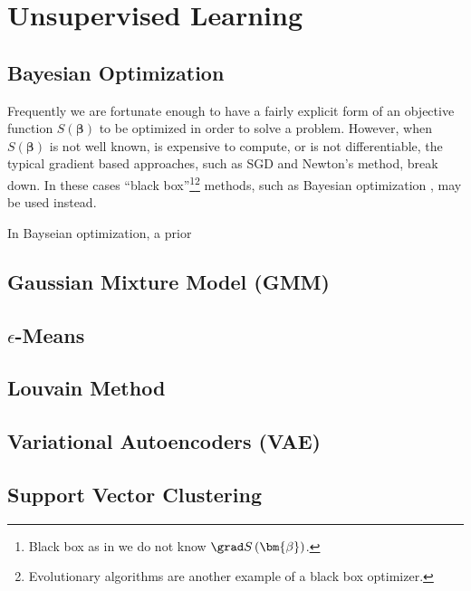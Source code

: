 \section{Unsupervised Learning}
\label{additional:unsupervised}

\subsection{Bayesian Optimization}
\label{additional:unsupervised:BO}

Frequently we are fortunate enough to have a fairly explicit form of
an objective function $S\left(\bm{\beta}\right)$ to be optimized in order to solve a problem.
However, when $S\left(\bm{\beta}\right)$ is not well known, is expensive to compute, or is not differentiable,
the typical gradient based approaches, such as SGD and Newton's method, break down.
In these cases ``black box''\footnote{Black box as in we do not know $\grad S\left(\bm{\beta}\right)$.}\footnote{Evolutionary algorithms
are another example of a black box optimizer.} methods,
such as Bayesian optimization \cite{Brochu2010,1301.1942,Borisyak,Hutter2014}, may be used instead.

In Bayseian optimization, a prior 


\subsection{Gaussian Mixture Model (GMM)}
\label{additional:unsupervised:GMM}

\subsection{\texorpdfstring{$\epsilon$}{epsilon}-Means}
\label{additional:unsupervised:epsilonMean}

\subsection{Louvain Method}
\label{additional:unsupervised:louvain}

\subsection{Variational Autoencoders (VAE)}
\label{additional:unsupervised:VAE}

\subsection{Support Vector Clustering}
\label{additional:unsupervised:SVC}

